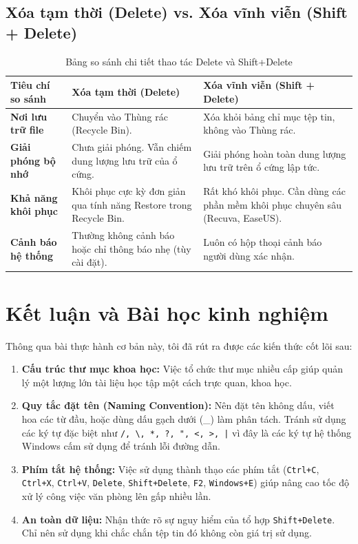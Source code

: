 \documentclass[12pt,a4paper]{article}
\begin{document}
\subsection{Xóa tạm thời (Delete) vs. Xóa vĩnh viễn (Shift + Delete)}
\begin{table}[H]
    \centering
    \caption{Bảng so sánh chi tiết thao tác Delete và Shift+Delete}
    \vspace{0.2cm}
    \begin{tabular}{|m{3.5cm}|m{5.5cm}|m{5.5cm}|}
        \hline
        \textbf{Tiêu chí so sánh} & \textbf{Xóa tạm thời (Delete)} & \textbf{Xóa vĩnh viễn (Shift + Delete)} \\
        \hline
        \textbf{Nơi lưu trữ file} & Chuyển vào Thùng rác (Recycle Bin). & Xóa khỏi bảng chỉ mục tệp tin, không vào Thùng rác. \\
        \hline
        \textbf{Giải phóng bộ nhớ} & Chưa giải phóng. Vẫn chiếm dung lượng lưu trữ của ổ cứng. & Giải phóng hoàn toàn dung lượng lưu trữ trên ổ cứng lập tức. \\
        \hline
        \textbf{Khả năng khôi phục} & Khôi phục cực kỳ đơn giản qua tính năng Restore trong Recycle Bin. & Rất khó khôi phục. Cần dùng các phần mềm khôi phục chuyên sâu (Recuva, EaseUS). \\
        \hline
        \textbf{Cảnh báo hệ thống} & Thường không cảnh báo hoặc chỉ thông báo nhẹ (tùy cài đặt). & Luôn có hộp thoại cảnh báo người dùng xác nhận. \\
        \hline
    \end{tabular}
    \label{tab:delete_vs_shiftdelete}
\end{table}

\newpage
\section{Kết luận và Bài học kinh nghiệm}
Thông qua bài thực hành cơ bản này, tôi đã rút ra được các kiến thức cốt lõi sau:
\begin{enumerate}
    \item \textbf{Cấu trúc thư mục khoa học:} Việc tổ chức thư mục nhiều cấp giúp quản lý một lượng lớn tài liệu học tập một cách trực quan, khoa học.
    \item \textbf{Quy tắc đặt tên (Naming Convention):} Nên đặt tên không dấu, viết hoa các từ đầu, hoặc dùng dấu gạch dưới (\_) làm phân tách. Tránh sử dụng các ký tự đặc biệt như \texttt{/, \textbackslash, *, ?, ", <, >, |} vì đây là các ký tự hệ thống Windows cấm sử dụng để tránh lỗi đường dẫn.
    \item \textbf{Phím tắt hệ thống:} Việc sử dụng thành thạo các phím tắt (\texttt{Ctrl+C}, \texttt{Ctrl+X}, \texttt{Ctrl+V}, \texttt{Delete}, \texttt{Shift+Delete}, \texttt{F2}, \texttt{Windows+E}) giúp nâng cao tốc độ xử lý công việc văn phòng lên gấp nhiều lần.
    \item \textbf{An toàn dữ liệu:} Nhận thức rõ sự nguy hiểm của tổ hợp \texttt{Shift+Delete}. Chỉ nên sử dụng khi chắc chắn tệp tin đó không còn giá trị sử dụng.
\end{enumerate}
\end{document}
